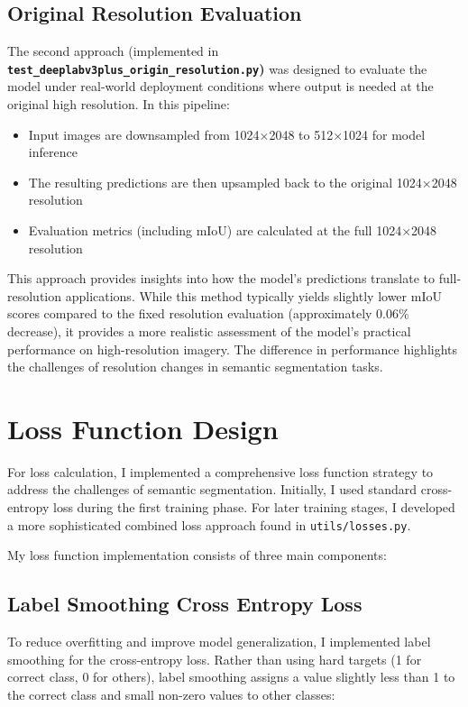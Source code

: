 \documentclass[]{article}
\begin{document}
\subsection{Original Resolution Evaluation}
The second approach (implemented in \textbf{\texttt{test\_deeplabv3plus\_origin\_resolution.py})} was designed to evaluate the model under real-world deployment conditions where output is needed at the original high resolution. In this pipeline:
\begin{itemize}
	\item Input images are downsampled from 1024×2048 to 512×1024 for model inference
	\item The resulting predictions are then upsampled back to the original 1024×2048 resolution
	\item Evaluation metrics (including mIoU) are calculated at the full 1024×2048 resolution
\end{itemize}
This approach provides insights into how the model's predictions translate to full-resolution applications. While this method typically yields slightly lower mIoU scores compared to the fixed resolution evaluation (approximately 0.06\% decrease), it provides a more realistic assessment of the model's practical performance on high-resolution imagery. The difference in performance highlights the challenges of resolution changes in semantic segmentation tasks.

\section{Loss Function Design}\label{sec:Loss_Function}

For loss calculation, I implemented a comprehensive loss function strategy to address the challenges of semantic segmentation. Initially, I used standard cross-entropy loss during the first training phase. For later training stages, I developed a more sophisticated combined loss approach found in \texttt{utils/losses.py}.

My loss function implementation consists of three main components:

\subsection{Label Smoothing Cross Entropy Loss}
To reduce overfitting and improve model generalization, I implemented label smoothing for the cross-entropy loss. Rather than using hard targets (1 for correct class, 0 for others), label smoothing assigns a value slightly less than 1 to the correct class and small non-zero values to other classes:
\end{document}
